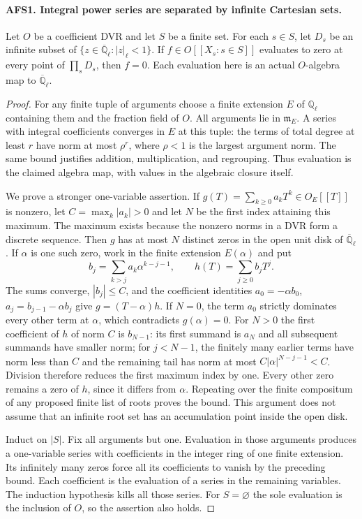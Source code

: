 \documentclass[11pt,a4paper]{article}
\numberwithin{equation}{section}
\theoremstyle{remark}\newtheorem{remark}[theorem]{Remark}
\begin{document}
\paragraph{AFS1. Integral power series are separated by infinite Cartesian sets.}
\label{claim:AFS1}
Let $O$ be a coefficient DVR and let $S$ be a finite set.  For each
$s\in S$, let $D_s$ be an infinite subset of
$\{z\in\overline{\mathbb Q}_\ell:|z|_\ell<1\}$.  If
$f\in O[[X_s:s\in S]]$ evaluates to zero at every point of
$\prod_sD_s$, then $f=0$.  Each evaluation here is an actual
$O$-algebra map to $\overline{\mathbb Q}_\ell$.
\begin{proof}
For any finite tuple of arguments choose a finite extension $E$ of
$\mathbb Q_\ell$ containing them and the fraction field of $O$.
All arguments lie in $\mathfrak m_E$.  A series with integral
coefficients converges in $E$ at this tuple: the terms of total
degree at least $r$ have norm at most $\rho^r$, where
$\rho<1$ is the largest argument norm.  The same bound justifies
addition, multiplication, and regrouping.  Thus evaluation is the
claimed algebra map, with values in the algebraic closure itself.

We prove a stronger one-variable assertion.  If
$g(T)=\sum_{k\geq0}a_kT^k\in O_E[[T]]$ is nonzero, let
$C=\max_k|a_k|>0$ and let $N$ be the first index attaining this
maximum.  The maximum exists because the nonzero norms in a DVR
form a discrete sequence.  Then $g$ has at most $N$ distinct zeros
in the open unit disk of $\overline{\mathbb Q}_\ell$.
If $\alpha$ is one such zero, work in the finite extension
$E(\alpha)$ and put
\[
 b_j=\sum_{k>j}a_k\alpha^{k-j-1},\qquad
 h(T)=\sum_{j\geq0}b_jT^j.
\]
The sums converge, $|b_j|\leq C$, and the coefficient identities
$a_0=-\alpha b_0$, $a_j=b_{j-1}-\alpha b_j$ give
$g=(T-\alpha)h$.  If $N=0$, the term $a_0$ strictly dominates
every other term at $\alpha$, which contradicts $g(\alpha)=0$.
For $N>0$ the first coefficient of $h$ of norm $C$ is
$b_{N-1}$: its first summand is $a_N$ and all subsequent summands
have smaller norm; for $j<N-1$, the finitely many earlier terms
have norm less than $C$ and the remaining tail has norm at most
$C|\alpha|^{N-j-1}<C$.  Division therefore reduces the first
maximum index by one.  Every other zero remains a zero of $h$,
since it differs from $\alpha$.  Repeating over the finite
compositum of any proposed finite list of roots proves the bound.
This argument does not assume that an infinite root set has an
accumulation point inside the open disk.

Induct on $|S|$.  Fix all arguments but one.  Evaluation in those
arguments produces a one-variable series with coefficients in the
integer ring of one finite extension.  Its infinitely many zeros
force all its coefficients to vanish by the preceding bound.
Each coefficient is the evaluation of a series in the remaining
variables.  The induction hypothesis kills all those series.
For $S=\varnothing$ the sole evaluation is the inclusion of $O$,
so the assertion also holds.
\end{proof}
\end{document}
